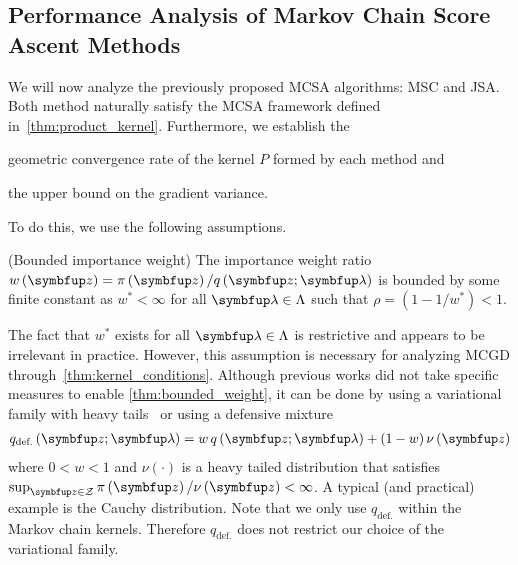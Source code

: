 %
%


\subsection{Performance Analysis of Markov Chain Score Ascent Methods}\label{section:comparison}
We will now analyze the previously proposed MCSA algorithms: MSC and JSA.
Both method naturally satisfy the MCSA framework defined in~\cref{thm:product_kernel}.
Furthermore, we establish the
\begin{enumerate*}[label=\textbf{(\roman*)}]
  \item geometric convergence rate of the kernel \(P\) formed by each method and
  \item the upper bound on the gradient variance.
\end{enumerate*}
To do this, we use the following assumptions.
\begin{assumption}{(Bounded importance weight)}\label{thm:bounded_weight}
  The importance weight ratio \(w\left(\vz\right) = \pi\left(\vz\right) / q\left(\vz; \vlambda\right)\) is bounded by some finite constant as \(w^* < \infty\) for all \(\vlambda \in \Lambda\) such that \(\rho = \left(1 - 1/w^*\right) < 1\).
\end{assumption}
The fact that \(w^*\) exists for all \(\vlambda \in \Lambda\) is restrictive and appears to be irrelevant in practice.
However, this assumption is necessary for analyzing MCGD through~\cref{thm:kernel_conditions}.
Although previous works did not take specific measures to enable \cref{thm:bounded_weight}, it can be done by using a variational family with heavy tails~\citep{NEURIPS2018_25db67c5} or using a defensive mixture~\citep{hesterberg_weighted_1995, holden_adaptive_2009} 
\begin{align*}
  q_{\text{def.}}\left(\vz; \vlambda \right) = w \, q\left(\vz; \vlambda\right) + (1 - w) \, \nu\left(\vz\right)
\end{align*}
where \(0 < w < 1\) and \(\nu\left(\cdot\right)\) is a heavy tailed distribution that satisfies \(\sup_{\vz \in \mathcal{Z}} \pi\left(\vz\right) / \nu\left(\vz\right) < \infty\).
A typical (and practical) example is the Cauchy distribution.
Note that we only use \(q_{\text{def.}}\) within the Markov chain kernels.
Therefore \(q_{\text{def.}}\) does not restrict our choice of the variational family.

